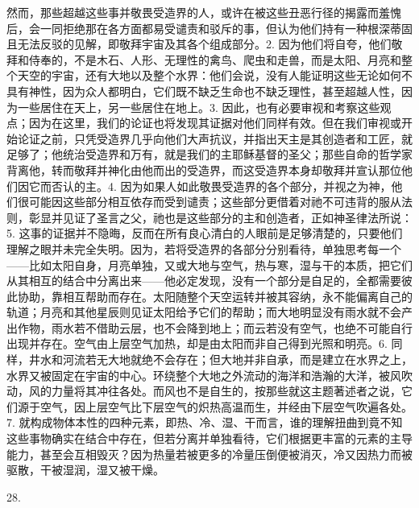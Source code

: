 然而，那些超越这些事并敬畏受造界的人，或许在被这些丑恶行径的揭露而羞愧后，会一同拒绝那在各方面都易受谴责和驳斥的事，但认为他们持有一种根深蒂固且无法反驳的见解，即敬拜宇宙及其各个组成部分。2. 因为他们将自夸，他们敬拜和侍奉的，不是木石、人形、无理性的禽鸟、爬虫和走兽，而是太阳、月亮和整个天空的宇宙，还有大地以及整个水界：他们会说，没有人能证明这些无论如何不具有神性，因为众人都明白，它们既不缺乏生命也不缺乏理性，甚至超越人性，因为一些居住在天上，另一些居住在地上。3. 因此，也有必要审视和考察这些观点；因为在这里，我们的论证也将发现其证据对他们同样有效。但在我们审视或开始论证之前，只凭受造界几乎向他们大声抗议，并指出天主是其创造者和工匠，就足够了；他统治受造界和万有，就是我们的主耶稣基督的圣父；那些自命的哲学家背离他，转而敬拜并神化由他而出的受造界，而这受造界本身却敬拜并宣认那位他们因它而否认的主。4. 因为如果人如此敬畏受造界的各个部分，并视之为神，他们很可能因这些部分相互依存而受到谴责；这些部分更借着对祂不可违背的服从法则，彰显并见证了圣言之父，祂也是这些部分的主和创造者，正如神圣律法所说：5. 这事的证据并不隐晦，反而在所有良心清白的人眼前是足够清楚的，只要他们理解之眼并未完全失明。因为，若将受造界的各部分分别看待，单独思考每一个——比如太阳自身，月亮单独，又或大地与空气，热与寒，湿与干的本质，把它们从其相互的结合中分离出来——他必定发现，没有一个部分是自足的，全都需要彼此协助，靠相互帮助而存在。太阳随整个天空运转并被其容纳，永不能偏离自己的轨道；月亮和其他星辰则见证太阳给予它们的帮助；而大地明显没有雨水就不会产出作物，雨水若不借助云层，也不会降到地上；而云若没有空气，也绝不可能自行出现并存在。空气由上层空气加热，却是由太阳而非自己得到光照和明亮。6. 同样，井水和河流若无大地就绝不会存在；但大地并非自承，而是建立在水界之上，水界又被固定在宇宙的中心。环绕整个大地之外流动的海洋和浩瀚的大洋，被风吹动，风的力量将其冲往各处。而风也不是自生的，按那些就这主题著述者之说，它们源于空气，因上层空气比下层空气的炽热高温而生，并经由下层空气吹遍各处。7. 就构成物体本性的四种元素，即热、冷、湿、干而言，谁的理解扭曲到竟不知这些事物确实在结合中存在，但若分离并单独看待，它们根据更丰富的元素的主导能力，甚至会互相毁灭？因为热量若被更多的冷量压倒便被消灭，冷又因热力而被驱散，干被湿润，湿又被干燥。\par

28. \par

